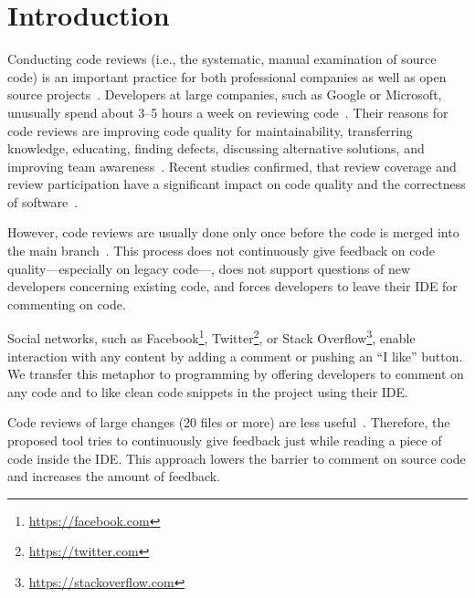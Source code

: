 
\section{Introduction}
Conducting code reviews (i.e., the systematic, manual examination of source code) is an important practice for both professional companies as well as open source projects~\cite{balachandran2013PeerCodeReviews, bird2015CodeReviewPlatform, rigby2013PeerCodeReviews, czerwonka2015codereviews, rigby2014PeerReviewOSS, feitelson2013development}.
%
Developers at large companies, such as Google or Microsoft, unusually spend about 3--5 hours a week on reviewing code~\cite{bosu2017ContemporaryCodeReview,Sadowski2018Google}.
%
Their reasons for code reviews are improving code quality for maintainability, transferring knowledge, educating, finding defects, discussing alternative solutions, and improving team awareness~\cite{rigby2013PeerCodeReviews, bacchelli2013expectations, bosu2017ContemporaryCodeReview, Sadowski2018Google}.
%
Recent studies confirmed, that review coverage and review participation have a significant impact on code quality and the correctness of software~\cite{mcintosh2014impact, mcintosh2016empirical, thongtanunam2015CodeReviews, shimagaki2016CRInSony}. 
%

%
However, code reviews are usually done only once before the code is merged into the main branch~\cite{rigby2013PeerCodeReviews, Sadowski2018Google}. 
%
This process does not continuously give feedback on code quality---especially on legacy code---, does not support questions of new developers concerning existing code, and forces developers to leave their IDE for commenting on code.
%

%
Social networks, such as Facebook\footnote{\url{https://facebook.com}}, Twitter\footnote{\url{https://twitter.com}}, or Stack Overflow\footnote{\url{https://stackoverflow.com}}, enable interaction with any content by adding a comment or pushing an \enquote{I like} button.
% 
We transfer this metaphor to programming by offering developers to comment on any code and to like clean code snippets in the project using their IDE.  
%

%
Code reviews of large changes (20 files or more) are less useful~\cite{czerwonka2015codereviews}.
%
Therefore, the proposed tool tries to continuously give feedback just while reading a piece of code inside the IDE. 
%
This approach lowers the barrier to comment on source code and increases the amount of feedback.
%
%
